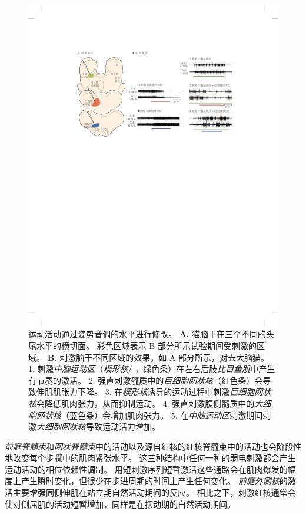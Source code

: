 \begin{figure}[htbp]
	\centering
	\includegraphics[width=0.95\linewidth]{chap33/fig_33_12}
	\caption{运动活动通过姿势音调的水平进行修改。
		\textbf{A.} 猫脑干在三个不同的头尾水平的横切面。 彩色区域表示 B 部分所示试验期间受刺激的区域。
		\textbf{B.} 刺激脑干不同区域的效果，如 A 部分所示，对去大脑猫。
		1. 刺激\textit{中脑运动区}（\textit{楔形核}/\textit{ }，绿色条）在左右后肢\textit{比目鱼肌}中产生有节奏的激活。
		2. 强直刺激髓质中的\textit{巨细胞网状核}（红色条）会导致伸肌肌张力下降。
		3. 在\textit{楔形核}诱导的运动过程中刺激\textit{巨细胞网状核}会降低肌肉张力，从而抑制运动。
		4. 强直刺激腹侧髓质中的\textit{大细胞网状核}（蓝色条）会增加肌肉张力。
		5. 在\textit{中脑运动区}刺激期间刺激\textit{大细胞网状核}导致运动活力增加。}
	\label{fig:33_12}
\end{figure}


\textit{前庭脊髓束}和\textit{网状脊髓束}中的活动以及源自红核的红核脊髓束中的活动也会阶段性地改变每个步骤中的肌肉紧张水平。
这三种结构中任何一种的弱电刺激都会产生运动活动的相位依赖性调制。
用短刺激序列短暂激活这些通路会在肌肉爆发的幅度上产生瞬时变化，但很少在步进周期的时间上产生任何变化。
\textit{前庭外侧核}的激活主要增强同侧伸肌在站立期自然活动期间的反应。
相比之下，刺激红核通常会使对侧屈肌的活动短暂增加，同样是在摆动期的自然活动期间。


